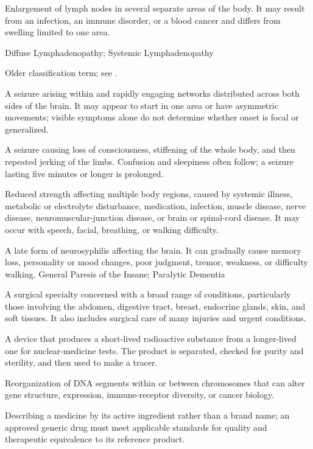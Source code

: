  Enlargement of lymph nodes in several separate areas of the body. It may result from an infection, an immune disorder, or a blood cancer and differs from swelling limited to one area.

\synonyms
Diffuse Lymphadenopathy; Systemic Lymphadenopathy

 Older classification term; see .

 A seizure arising within and rapidly engaging networks distributed across both sides of the brain. It may appear to start in one area or have asymmetric movements; visible symptoms alone do not determine whether onset is focal or generalized.

 A seizure causing loss of consciousness, stiffening of the whole body, and then repeated jerking of the limbs. Confusion and sleepiness often follow; a seizure lasting five minutes or longer is prolonged.

 Reduced strength affecting multiple body regions, caused by systemic illness, metabolic or electrolyte disturbance, medication, infection, muscle disease, nerve disease, neuromuscular-junction disease, or brain or spinal-cord disease. It may occur with speech, facial, breathing, or walking difficulty.

 A late form of neurosyphilis affecting the brain. It can gradually cause memory loss, personality or mood changes, poor judgment, tremor, weakness, or difficulty walking.
\synonyms
General Paresis of the Insane; Paralytic Dementia

 A surgical specialty concerned with a broad range of conditions, particularly those involving the abdomen, digestive tract, breast, endocrine glands, skin, and soft tissues. It also includes surgical care of many injuries and urgent conditions.

 A device that produces a short-lived radioactive substance from a longer-lived one for nuclear-medicine tests. The product is separated, checked for purity and sterility, and then used to make a tracer.

 Reorganization of DNA segments within or between chromosomes that can alter gene structure, expression, immune-receptor diversity, or cancer biology.

 Describing a medicine by its active ingredient rather than a brand name; an approved generic drug must meet applicable standards for quality and therapeutic equivalence to its reference product.

